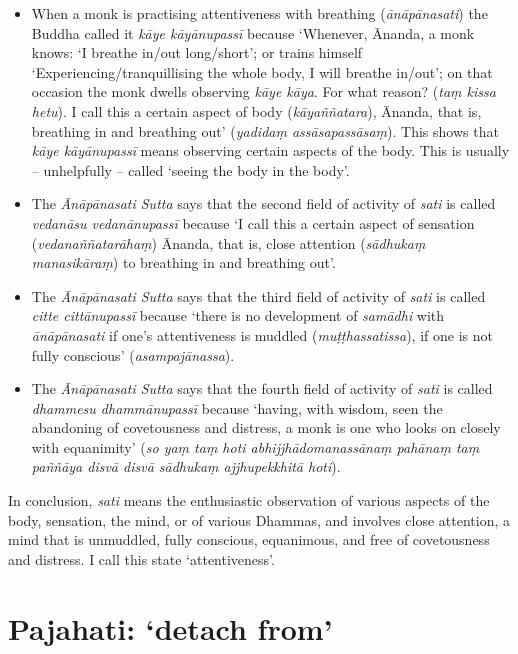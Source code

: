 \begin{itemize}

\item When a monk is practising attentiveness with breathing (\textit{ānāpānasati}) the Buddha called it \textit{kāye kāyānupassī} because `Whenever, Ānanda, a monk knows: `I breathe in/out long/short'; or trains himself `Experiencing/tranquillising the whole body, I will breathe in/out'; on that occasion the monk dwells observing \textit{kāye kāya}. For what reason? (\textit{taṃ kissa hetu}). I call this a certain aspect of body (\textit{kāyaññatara}), Ānanda, that is, breathing in and breathing out' (\textit{yadidaṃ assāsapassāsaṃ}). This shows that \textit{kāye kāyānupassī} means observing certain aspects of the body. This is usually -- unhelpfully -- called `seeing the body in the body'.

\item The \textit{Ānāpānasati Sutta} says that the second field of activity of \textit{sati} is called \textit{vedanāsu vedanānupassī} because `I call this a certain aspect of sensation (\textit{vedanaññatarāhaṃ}) Ānanda, that is, close attention (\textit{sādhukaṃ manasikāraṃ}) to breathing in and breathing out'.

\item The \textit{Ānāpānasati Sutta} says that the third field of activity of \textit{sati} is called \textit{citte cittānupassī} because `there is no development of \textit{samādhi} with \textit{ānāpānasati} if one's attentiveness is muddled (\textit{muṭṭhassatissa}), if one is not fully conscious' (\textit{asampajānassa}).

\item The \textit{Ānāpānasati Sutta} says that the fourth field of activity of \textit{sati} is called \textit{dhammesu dhammānupassī} because `having, with wisdom, seen the abandoning of covetousness and distress, a monk is one who looks on closely with equanimity' (\textit{so yaṃ taṃ hoti abhijjhādomanassānaṃ pahānaṃ taṃ paññāya disvā disvā sādhukaṃ ajjhupekkhitā hoti}).

\end{itemize}

In conclusion, \textit{sati} means the enthusiastic observation of various aspects of the body, sensation, the mind, or of various Dhammas, and involves close attention, a mind that is unmuddled, fully conscious, equanimous, and free of covetousness and distress. I call this state `attentiveness'.

\section*{Pajahati: `detach from'}

